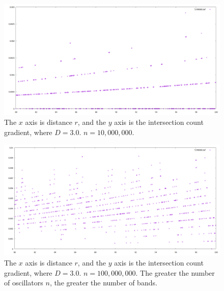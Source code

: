 \documentclass[12pt]{article}
\begin{document}
\pagebreak



\begin{figure} 
\centering
  \includegraphics[width = 6 in]{10000000.png}
  \caption{
The $x$ axis is distance $r$, and the $y$ axis is the intersection count gradient, where $D =3.0$. $n = 10,000,000$.
}
\end{figure}


\begin{figure} 
\centering
  \includegraphics[width = 6 in]{100000000.png}
  \caption{
The $x$ axis is distance $r$, and the $y$ axis is the intersection count gradient, where $D =3.0$. $n = 100,000,000$.
The greater the number of oscillators $n$, the greater the number of bands.
}
\end{figure}
\end{document}
